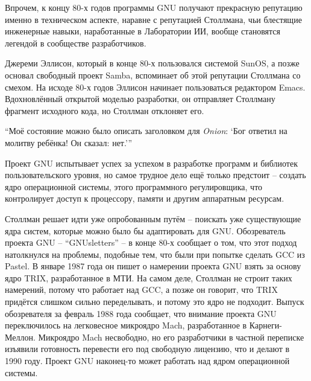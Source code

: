 Впрочем, к концу 80-х годов программы GNU получают прекрасную репутацию именно в техническом аспекте, наравне с репутацией Столлмана, чьи блестящие инженерные навыки, наработанные в Лаборатории ИИ, вообще становятся легендой в сообществе разработчиков.

Джереми Эллисон, который в конце 80-х пользовался системой SunOS, а позже основал свободный проект Samba, вспоминает об этой репутации Столлмана со смехом. На исходе 80-х годов Эллисон начинает пользоваться редактором Emacs. Вдохновлённый открытой моделью разработки, он отправляет Столлману фрагмент исходного кода, но Столлман отклоняет его.

``Моё состояние можно было описать заголовком для \textit{Onion}: \hspace{0.01in}`Бог ответил на молитву ребёнка! Он сказал: нет.'\hspace{0.01in}''

Проект GNU испытывает успех за успехом в разработке программ и библиотек пользовательского уровня, но самое трудное дело ещё только предстоит -- создать ядро операционной системы, этого программного регулировщика, что контролирует доступ к процессору, памяти и другим аппаратным ресурсам.

Столлман решает идти уже опробованным путём -- поискать уже существующие ядра систем, которые можно было бы адаптировать для GNU. Обозреватель проекта GNU -- ``GNUsletters'' -- в конце 80-х сообщает о том, что этот подход натолкнулся на проблемы, подобные тем, что были при попытке сделать GCC из Pastel. В январе 1987 года он пишет о намерении проекта GNU взять за основу ядро TRIX, разработанное в МТИ. На самом деле, Столлман не строит таких намерений, потому что работает над GCC, а позже он говорит, что TRIX придётся слишком сильно переделывать, и потому это ядро не подходит. Выпуск обозревателя за февраль 1988 года сообщает, что внимание проекта GNU переключилось на легковесное микроядро Mach, разработанное в Карнеги-Меллон. Микроядро Mach несвободно, но его разработчики в частной переписке изъявили готовность перевести его под свободную лицензию, что и делают в 1990 году. Проект GNU наконец-то может работать над ядром операционной системы. 

